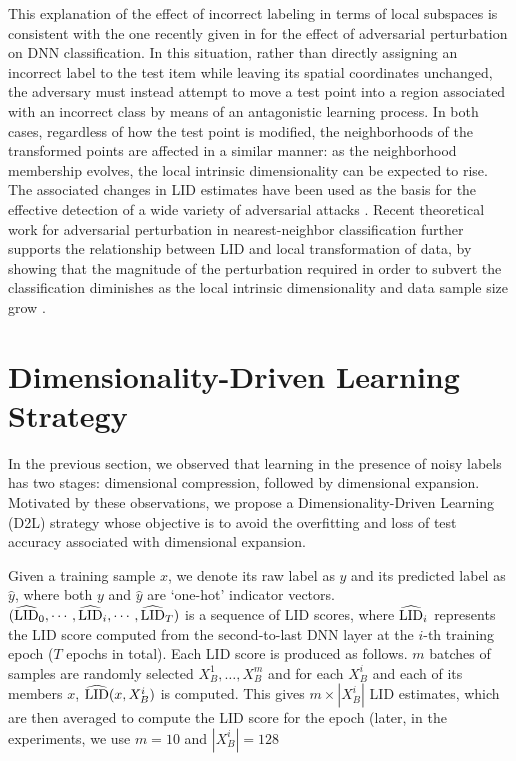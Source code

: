 \documentclass{article}
\begin{document}
This explanation of the effect of incorrect labeling in terms of local subspaces is consistent with the one recently given in \cite{ma2018characterizing} for the effect of adversarial perturbation on DNN classification. 
In this situation, rather than directly assigning an incorrect label to the test item while leaving its spatial coordinates unchanged, the adversary must instead attempt to move a test point into a region associated with an incorrect class by means of an antagonistic learning process. 
In both cases, regardless of how the test point is modified, the neighborhoods of the transformed points are affected in a similar manner: as the neighborhood membership evolves, the local intrinsic dimensionality can be expected to rise. The associated changes in LID estimates have been used as the basis for the effective detection of a wide variety of adversarial attacks \citep{ma2018characterizing}.
Recent theoretical work for adversarial perturbation in nearest-neighbor classification further supports the relationship between LID and local transformation of data, by showing that the magnitude of the perturbation required in order to subvert the classification diminishes as the local intrinsic dimensionality and data sample size grow \citep{advperturbWIFS17}.



\section{Dimensionality-Driven Learning Strategy}
\label{sec:manifold-learning}
In the previous section, we observed that learning in the presence of noisy labels has two stages: dimensional compression, followed by dimensional expansion. Motivated by these observations, we propose a Dimensionality-Driven Learning (D2L) strategy whose objective is to avoid the overfitting and loss of test accuracy associated with dimensional expansion. 

Given a training sample $x$, we denote its raw label as $y$ and its predicted label as $\widehat y$, where both $y$ and $\widehat y$ are `one-hot' indicator vectors. $(\widehat{\textup{LID}}_{0}, \cdots, \widehat{\textup{LID}}_{i}, \cdots,  \widehat{\textup{LID}}_{T})$ is a sequence of LID scores, where $\widehat{\textup{LID}}_{i}$ represents the LID score computed from the second-to-last DNN layer at the $i$-th training epoch ($T$ epochs in total). Each LID score is produced as follows.   $m$ batches of samples are randomly selected $X_B^1,\ldots,X_B^m$ and for each $X_B^i$ and each of its members $x$, $\widehat{\textup{LID}}(x, X_B^i)$ is computed.    This gives $m \times |X_B^i|$ LID estimates, which are then averaged to compute the LID score for the epoch (later, in the experiments, we use $m=10$ and $|X_B^i|=128$
\end{document}
